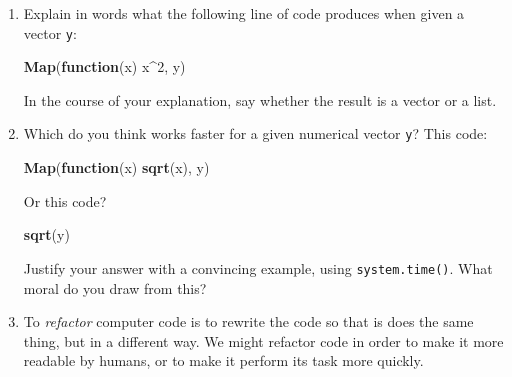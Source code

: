 \documentclass[]{book}
\makeatletter
\newenvironment{Shaded}{\begin{snugshade}}{\end{snugshade}}
\newcommand{\KeywordTok}[1]{\textcolor[rgb]{0.13,0.29,0.53}{\textbf{#1}}}
\newcommand{\DecValTok}[1]{\textcolor[rgb]{0.00,0.00,0.81}{#1}}
\newcommand{\ControlFlowTok}[1]{\textcolor[rgb]{0.13,0.29,0.53}{\textbf{#1}}}
\newcommand{\OperatorTok}[1]{\textcolor[rgb]{0.81,0.36,0.00}{\textbf{#1}}}
\newcommand{\NormalTok}[1]{#1}
\providecommand{\tightlist}{%
  \setlength{\itemsep}{0pt}\setlength{\parskip}{0pt}}
\newenvironment{kframe}{%
\medskip{}
\setlength{\fboxsep}{.8em}
 \def\at@end@of@kframe{}%
 \ifinner\ifhmode%
  \def\at@end@of@kframe{\end{minipage}}%
  \begin{minipage}{\columnwidth}%
 \fi\fi%
 \def\FrameCommand##1{\hskip\@totalleftmargin \hskip-\fboxsep
 \colorbox{shadecolor}{##1}\hskip-\fboxsep
     \hskip-\linewidth \hskip-\@totalleftmargin \hskip\columnwidth}%
 \MakeFramed {\advance\hsize-\width
   \@totalleftmargin\z@ \linewidth\hsize
   \@setminipage}}%
 {\par\unskip\endMakeFramed%
 \at@end@of@kframe}
\renewenvironment{Shaded}{\begin{kframe}}{\end{kframe}}
\theoremstyle{definition}
\theoremstyle{definition}
\theoremstyle{definition}
\theoremstyle{remark}
\makeatother
\begin{document}
{\begin{enumerate}
  Examine the ``table'' you got with \texttt{tapply()}.

  \begin{itemize}
  \tightlist
  \item
    Are there any sectors in which it seems that women typically make
    more than men. If so, what sectors are they?
  \item
    On the other hand, are there any sectors where men typically make
    more than women? If so, what sectors are they?
  \item
    Based on your analysis, does it seem plausible that women made less
    than men simply because they chose lower-paying sectors of
    employment?
  \end{itemize}
\item
  Explain in words what the following line of code produces when given a
  vector \texttt{y}:

\begin{Shaded}
\begin{Highlighting}[]
\KeywordTok{Map}\NormalTok{(}\ControlFlowTok{function}\NormalTok{(x) x}\OperatorTok{^}\DecValTok{2}\NormalTok{, y)}
\end{Highlighting}
\end{Shaded}

  In the course of your explanation, say whether the result is a vector
  or a list.
\item
  Which do you think works faster for a given numerical vector
  \texttt{y}? This code:

\begin{Shaded}
\begin{Highlighting}[]
\KeywordTok{Map}\NormalTok{(}\ControlFlowTok{function}\NormalTok{(x) }\KeywordTok{sqrt}\NormalTok{(x), y)}
\end{Highlighting}
\end{Shaded}

  Or this code?

\begin{Shaded}
\begin{Highlighting}[]
  \KeywordTok{sqrt}\NormalTok{(y)}
\end{Highlighting}
\end{Shaded}

  Justify your answer with a convincing example, using
  \texttt{system.time()}. What moral do you draw from this?
\item
  To \emph{refactor} computer code is to rewrite the
  code so that is does the same thing, but in a different way. We might
  refactor code in order to make it more readable by humans, or to make
  it perform its task more quickly.


\end{enumerate}}
\end{document}
